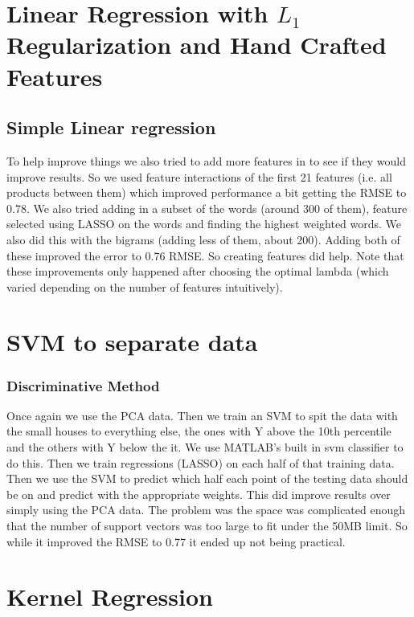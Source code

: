 \documentclass[a4paper,10pt]{article}
\begin{document}
\section{Linear Regression with $L_1$ Regularization and Hand Crafted Features}
\subsection*{Simple Linear regression}
To help improve things we also tried to add more features in to see if they would improve results. So we used feature interactions of the first 21 features (i.e. all products between them) which improved performance a bit getting the RMSE to 0.78. We also tried adding in a subset of the words (around 300 of them), feature selected using LASSO on the words and finding the highest weighted words. We also did this with the bigrams (adding less of them, about 200). Adding both of these improved the error to 0.76 RMSE. So creating features did help. Note that these improvements only happened after choosing the optimal lambda (which varied depending on the number of features intuitively). 


\section{SVM to separate data}
\subsubsection*{Discriminative Method}
Once again we use the PCA data. Then we train an SVM to spit the data with the small houses to everything else, the ones with Y above the 10th percentile and the others with Y below the it. We use MATLAB's built in svm classifier to do this. Then we train regressions (LASSO) on each half of that training data. Then we use the SVM to predict which half each point of the testing data should be on and predict with the appropriate weights. This did improve results over simply using the PCA data. The problem was the space was complicated enough that the number of support vectors was too large to fit under the 50MB limit. So while it improved the RMSE to 0.77 it ended up not being practical.


\section{Kernel Regression}
\end{document}
